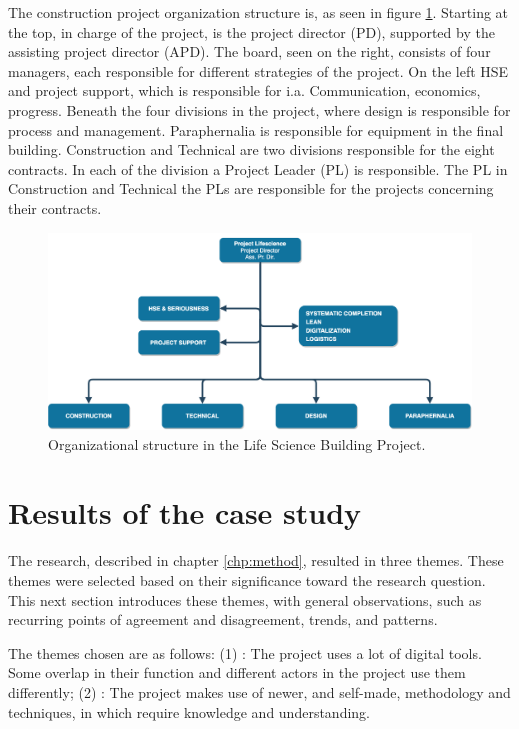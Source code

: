 The construction project organization structure is, as seen in figure \ref{fig:project_structure}. Starting at the top, in charge of the project, is the project director (PD), supported by the assisting project director (APD). The board, seen on the right, consists of four managers, each responsible for different strategies of the project. On the left HSE and project support, which is responsible for i.a. Communication, economics, progress. Beneath the four divisions in the project, where design is responsible for process and management. Paraphernalia is responsible for equipment in the final building. Construction and Technical are two divisions responsible for the eight contracts. In each of the division a Project Leader (PL) is responsible. The PL in Construction and Technical the PLs are responsible for the projects concerning their contracts.

\begin{figure}
    \centering
    \includegraphics[width=\textwidth]{fig/lvb_diagram.png}
    \caption{Organizational structure in the Life Science Building Project.}
    \label{fig:project_structure}
\end{figure}

\section{Results of the case study}
The research, described in chapter \ref{chp:method}, resulted in three themes. These themes were selected based on their significance toward the research question. This next section introduces these themes, with general observations, such as recurring points of agreement and disagreement, trends, and patterns. 

The themes chosen are as follows: (1) : The project uses a lot of digital tools. Some overlap in their function and different actors in the project use them differently; (2) : The project makes use of newer, and self-made, methodology and techniques, in which require knowledge and understanding.

